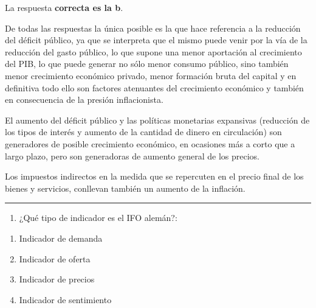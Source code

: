 \documentclass[
  letterpaper,
  DIV=11,
  numbers=noendperiod]{scrreprt}
\providecommand{\tightlist}{%
  \setlength{\itemsep}{0pt}\setlength{\parskip}{0pt}}\usepackage{longtable,booktabs,array}
\begin{document}
\begin{tcolorbox}[enhanced jigsaw, left=2mm, opacityback=0, colback=white, breakable, arc=.35mm, bottomrule=.15mm, rightrule=.15mm, toprule=.15mm, leftrule=.75mm, colframe=quarto-callout-tip-color-frame]
\begin{minipage}[t]{5.5mm}
\textcolor{quarto-callout-tip-color}{\faLightbulb}
\end{minipage}%
\begin{minipage}[t]{\textwidth - 5.5mm}

La respuesta \textbf{correcta es la b}.

De todas las respuestas la única posible es la que hace referencia a la
reducción del déficit público, ya que se interpreta que el mismo puede
venir por la vía de la reducción del gasto público, lo que supone una
menor aportación al crecimiento del PIB, lo que puede generar no sólo
menor consumo público, sino también menor crecimiento económico privado,
menor formación bruta del capital y en definitiva todo ello son factores
atenuantes del crecimiento económico y también en consecuencia de la
presión inflacionista.

El aumento del déficit público y las políticas monetarias expansivas
(reducción de los tipos de interés y aumento de la cantidad de dinero en
circulación) son generadores de posible crecimiento económico, en
ocasiones más a corto que a largo plazo, pero son generadoras de aumento
general de los precios.

Los impuestos indirectos en la medida que se repercuten en el precio
final de los bienes y servicios, conllevan también un aumento de la
inflación.

\end{minipage}%
\end{tcolorbox}

\begin{center}\rule{0.5\linewidth}{0.5pt}\end{center}

\begin{enumerate}
\def\labelenumi{\arabic{enumi}.}
\setcounter{enumi}{12}
\tightlist
\item
  ¿Qué tipo de indicador es el IFO alemán?:
\end{enumerate}

\begin{enumerate}
\def\labelenumi{\alph{enumi})}
\item
  Indicador de demanda
\item
  Indicador de oferta
\item
  Indicador de precios
\item
  Indicador de sentimiento
\end{enumerate}
\end{document}
